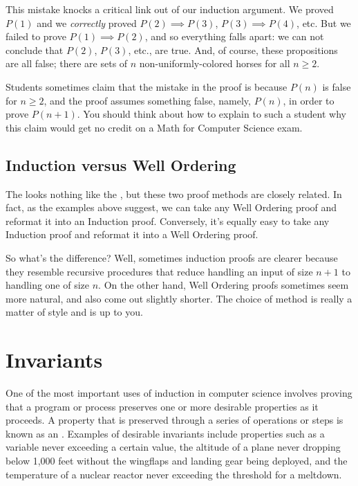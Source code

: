 This mistake knocks a critical link out of our induction argument.  We
proved $P(1)$ and we \emph{correctly} proved $P(2) \implies P(3)$, $P(3)
\implies P(4)$, etc.  But we failed to prove $P(1) \implies P(2)$, and so
everything falls apart: we can not conclude that $P(2)$, $P(3)$, etc., are
true.  And, of course, these propositions are all false; there are
sets of $n$ non-uniformly-colored horses for all $n \ge 2$.

Students sometimes claim that the mistake in the proof is because
$P(n)$ is false for $n \geq 2$, and the proof assumes something false,
namely, $P(n)$, in order to prove $P(n+1)$.  You should think about
how to explain to such a student why this claim would get no credit on
a Math for Computer Science exam.

\subsection{Induction versus Well Ordering}\label{versusWO}

The  looks nothing like the , but these two proof methods are closely related.  In fact,
as the examples above suggest, we can take any Well Ordering proof and
reformat it into an Induction proof.  Conversely, it's equally easy to
take any Induction proof and reformat it into a Well Ordering proof.

So what's the difference?  Well, sometimes induction proofs are clearer
because they resemble recursive procedures that reduce handling an input
of size $n+1$ to handling one of size $n$.  On the other hand, Well
Ordering proofs sometimes seem more natural, and also come out slightly
shorter.  The choice of method is really a matter of style and is up
to you.



\section{Invariants}

One of the most important uses of induction in computer science
involves proving that a program or process preserves one or more
desirable properties as it proceeds.  A property that is preserved
through a series of operations or steps is known as an
.  Examples of desirable invariants include properties
such as a variable never exceeding a certain value, the altitude of a
plane never dropping below 1,000 feet without the wingflaps and
landing gear being deployed, and the temperature of a nuclear reactor
never exceeding the threshold for a meltdown.

